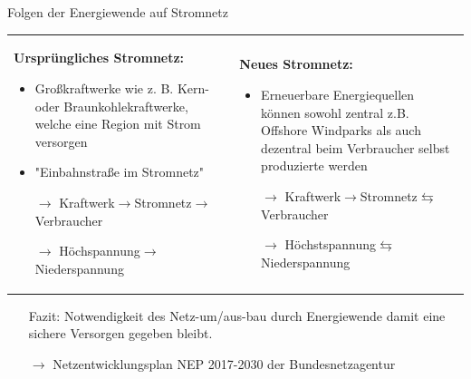 \documentclass[aspectratio=1610, professionalfonts, 9pt]{beamer}
\begin{document}
\begin{frame}{Folgen der Energiewende auf Stromnetz}
  \begin{tabular}{p{}p{}}
\textbf{\textcolor{tugreen}{Ursprüngliches Stromnetz:}}
\begin{itemize}
  \item Großkraftwerke wie z. B. Kern- oder Braunkohlekraftwerke,
  welche eine Region mit Strom versorgen
  \item "Einbahnstraße im Stromnetz"
\item[$\rightarrow$]  Kraftwerk$\rightarrow$Stromnetz$\rightarrow$Verbraucher
\item[$\rightarrow$]  Höchspannung$\rightarrow$Niederspannung
\end{itemize}
&
\textbf{\textcolor{tugreen}{Neues Stromnetz:}}

\begin{itemize}
  \item Erneuerbare Energiequellen können
  sowohl zentral z.B. Offshore Windparks als auch
  dezentral beim Verbraucher selbst
  produzierte werden
\item[$\rightarrow$]  Kraftwerk$\rightarrow$Stromnetz$\leftrightarrows$Verbraucher
\item[$\rightarrow$]  Höchstspannung$\leftrightarrows$Niederspannung
\end{itemize}
\end{tabular}
\begin{itemize}
\item[Fazit:] Notwendigkeit des Netz-um/aus-bau durch Energiewende
damit eine sichere Versorgen gegeben bleibt.
\item[$\rightarrow$] Netzentwicklungsplan NEP 2017-2030 der Bundesnetzagentur 
\end{itemize}

\end{frame}
\end{document}

